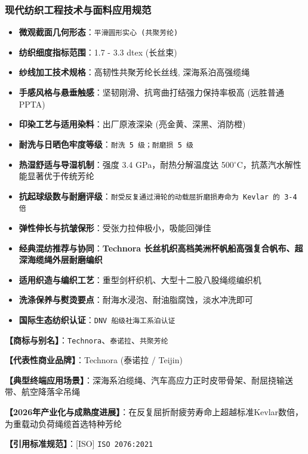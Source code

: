 \documentclass[11pt,openright,twoside,UTF8]{ctexbook}
\begin{document}
\subsubsection*{现代纺织工程技术与面料应用规范}
\begin{itemize} \setlength{\itemsep}{2pt}
    \item \textbf{微观截面几何形态}：\texttt{平滑圆形实心 (共聚芳纶)}
    \item \textbf{纺织细度指标范围}：1.7 - 3.3 dtex (长丝束)
    \item \textbf{纱线加工技术规格}：高韧性共聚芳纶长丝线, 深海系泊高强缆绳
    \item \textbf{手感风格与悬垂触感}：坚韧刚滑、抗弯曲打结强力保持率极高 (远胜普通PPTA)
    \item \textbf{印染工艺与适用染料}：出厂原液深染 (亮金黄、深黑、消防橙)
    \item \textbf{耐洗与日晒色牢度等级}：\texttt{耐洗 5 级；耐磨损 5 级}
    \item \textbf{热湿舒适与导湿机制}：强度 3.4 GPa，耐热分解温度达 500$^\circ\mathrm{C}$，抗蒸汽水解性能显著优于传统芳纶
    \item \textbf{抗起球级数与耐磨评级}：\texttt{耐受反复通过滑轮的动载屈折磨损寿命为 Kevlar 的 3-4 倍}
    \item \textbf{弹性伸长与抗皱保形}：受张力拉伸极小，吸能回弹佳
    \item \textbf{经典混纺推荐与协同}：\textbf{Technora 长丝机织高档美洲杯帆船高强复合帆布、超深海缆绳外层耐磨编织}
    \item \textbf{适用织造与编织工艺}：重型剑杆织机、大型十二股八股绳缆编织机
    \item \textbf{洗涤保养与熨烫要点}：耐海水浸泡、耐油脂腐蚀，淡水冲洗即可
    \item \textbf{国际生态纺织认证}：\texttt{DNV 船级社海工系泊认证}
\end{itemize}
\vspace{0.2cm}

\noindent\textbf{【商标与别名】}：\texttt{Technora}、\texttt{泰诺拉}、\texttt{共聚芳纶}\par
\noindent\textbf{【代表性商业品牌】}：Technora (泰诺拉 / Teijin)\par
\noindent\textbf{【典型终端应用场景】}：深海系泊缆绳、汽车高应力正时皮带骨架、耐屈挠输送带、航空降落伞吊绳\par
\noindent\textbf{【2026年产业化与成熟度进展】}：在反复屈折耐疲劳寿命上超越标准Kevlar数倍，为重载动负荷绳缆首选特种芳纶\par
\noindent\textbf{【引用标准规范】}：[ISO] \texttt{ISO 2076:2021}\par
\vspace{0.5cm}
\end{document}
